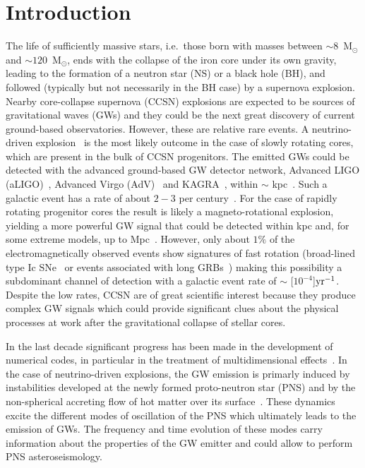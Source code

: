 
\section{Introduction}


The life of sufficiently massive stars, i.e.~those born with masses between $\sim 8$~M$_\odot$ and $\sim 120$~M$_\odot$, ends with the collapse of {the} iron core under {its} own gravity, leading {to} the formation of a neutron star {(NS)} or a black hole (BH), {and} followed (typically but not necessarily in the BH case) by {a supernova} explosion.
Nearby core-collapse supernova (CCSN) explosions are expected to be sources of gravitational waves (GWs) and they could be the next great discovery of current ground-based observatories. However, these are relative rare events. A neutrino-driven explosion~\citep{Bethe:1990} is the most likely outcome in the case of slowly rotating cores, which are present in the bulk of CCSN progenitors.
The emitted GWs could be detected with the advanced ground-based GW detector network, Advanced LIGO (aLIGO)~\citep{TheLIGOScientific:2014jea}, Advanced Virgo (AdV)~\citep{TheVirgo:2014hva} and KAGRA~\citep{Aso:2013eba}, within $\sim$ \unit[5]{kpc}~\citep{Gossan:2016,TargetedSNSearchO12}. Such a galactic event has a rate of about $2-3$ per century~\citep{Adams:2013,Rozwadowska:2021}.
For the case of rapidly rotating progenitor cores the result is likely a magneto-rotational explosion, yielding  a more powerful GW signal that could be detected within \unit[50]{kpc} and, for some extreme models, up to \unit[5--30]{Mpc}~\citep{Gossan:2016,TargetedSNSearchO12}. However, only about $1\%$ of the electromagnetically observed events show signatures of fast rotation (broad-lined type Ic SNe~\citep{Li:2011b} or events associated with long GRBs~\citep{Chapman:2007}) making this possibility a subdominant channel of detection with a galactic event rate of $\sim$ \unit[$10^{-4}$]{$\rm {yr}^{-1}$}.
Despite the low rates, CCSN are of great scientific interest because they produce complex GW signals which could provide significant clues about the physical processes at work after the gravitational collapse of stellar cores. 


In the last decade significant progress has been made in the development of numerical codes, {in particular in the treatment of multidimensional effects~\citep{BMueller:2020}.} In the case of  neutrino-driven explosions, the GW emission is {primarly induced by instabilities developed at the newly formed proto-neutron star (PNS) and by the non-spherical accreting flow of hot matter over its surface~\citep{Kotake:2017}.  These} dynamics excite the different modes of oscillation of the PNS which ultimately leads to the emission of GWs. The frequency and time evolution of these modes carry information about the properties of the GW emitter and could allow to perform PNS asteroseismology. 


